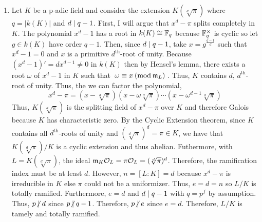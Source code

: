 \documentclass[12pt]{extarticle}
\begin{document}
\begin{enumerate}
\begin{enumerate}
\item Let $K$ be a p-adic field and consider the extension $K(\sqrt[d]{\pi})$ where $q = |k(K)|$ and $d \mid q - 1$. First, I will argue that $x^d - \pi$ splits completely in $K$. The polynomial $x^d - 1$ has a root in $k(K) \cong \mathbb{F}_{q}$ because $\mathbb{F}_{q}^\times$ is cyclic so let $g \in k(K)$ have order $q - 1$. Then, since $d \mid q - 1$, take $x = g^{\frac{q - 1}{d}}$ such that $x^d - 1 = 0$ and $x$ is a primitive $d^{\mathrm{th}}$-root of unity.  Because $(x^d - 1)' = d x^{d - 1} \neq 0$ in $k(K)$ then by Hensel's lemma, there exists a root $\omega$ of $x^d - 1$ in $K$ such that $\: \omega \equiv x \: (\mathrm{mod} \: \mathfrak{m}_{L}) \:$. Thus, $K$ contains $d$, $d^{\mathrm{th}}$-root of unity. Thus, the we can factor the polynomial,
\[ x^d - \pi = (x - \sqrt[d]{\pi})(x - \omega \sqrt[d]{\pi}) \cdots (x - \omega^{d - 1} \sqrt[d]{\pi}) \]
Thus, $K(\sqrt[d]{\pi})$ is the splitting field of $x^d - \pi$ over $K$ and therefore Galois because $K$ has characteristic zero. By the Cyclic Extension theorem, since $K$ contains all $d^{\mathrm{th}}$-roots of unity and $(\sqrt[d]{\pi})^d = \pi \in K$, we have that $K(\sqrt[d]{\pi})/K$ is a cyclic extension and thus abelian. Futhermore, with $L = K(\sqrt[d]{\pi})$, the ideal $\mathfrak{m}_K \mathcal{O}_{L} = \pi \mathcal{O}_{L} = (\sqrt[d]{\pi})^d$. Therefore, the ramification index must be at least $d$. However, $n = [L : K] = d$ because $x^d - \pi$ is irreducible in $K$ else $\pi$ could not be a uniformizer. Thus, $e = d = n$ so $L/K$ is totally ramified. Furthermore, $e = d$ and $d \mid q - 1$ with $q = p^f$ by assumption. Thus, $p \ndivides d$ since $p \ndivides q - 1$. Therefore, $p \ndivides e$ since $e = d$. Therefore, $L/K$ is tamely and totally ramified.  

\end{enumerate}
\end{enumerate}
\end{document}
